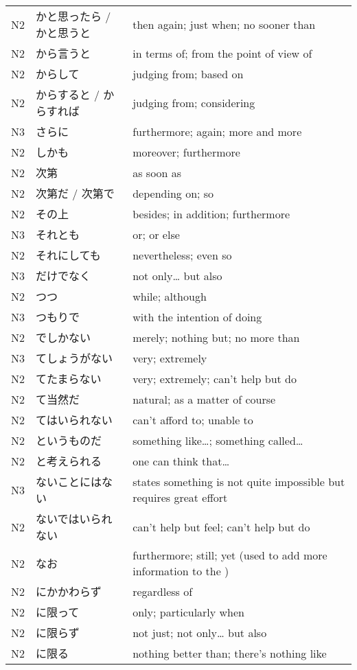 \begin{table}[h!]
\begin{tabular}{lll}
N2	&   かと思ったら / かと思うと	& then again; just when; no sooner than\\
N2	&   から言うと   &	in terms of; from the point of view of\\
N2	&   からして	&   judging from; based on\\
N2	&   からすると / からすれば	&   judging from; considering\\
N3	&   さらに    &   	furthermore; again; more and more\\
N2	&   しかも	&       moreover; furthermore\\
N2	&   次第	     &      as soon as\\
N2	&   次第だ / 次第で &	depending on; so\\
N2	&   その上	&       besides; in addition; furthermore\\
N3	&   それとも  &	    or; or else\\
N2	&   それにしても & 	nevertheless; even so\\
N3	&   だけでなく   &	not only… but also\\
N2	&   つつ	&           while; although\\
N3	&   つもりで	&       with the intention of doing\\
N2	&   でしかない	&   merely; nothing but; no more than\\
N3	&   てしょうがない & 	very; extremely\\
N2	&   てたまらない	&   very; extremely; can't help but do\\
N2	&   て当然だ	&       natural; as a matter of course\\
N2	&   てはいられない & 	can't afford to; unable to\\
N2	&   というものだ  &	something like…; something called…\\
N2	&   と考えられる &	one can think that…\\
N3	&   ないことにはない &	states something is not quite impossible but requires great effort\\
N2	&   ないではいられない & can't help but feel; can't help but do\\
N2	&   なお	    &        furthermore; still; yet (used to add more information to the )\\
N2	&   にかかわらず &	regardless of\\
N2	&   に限って &	    only; particularly when\\
N2	&   に限らず &	    not just; not only… but also\\
N2	&   に限る &       	nothing better than; there's nothing like\\

\end{tabular}
\end{table}
